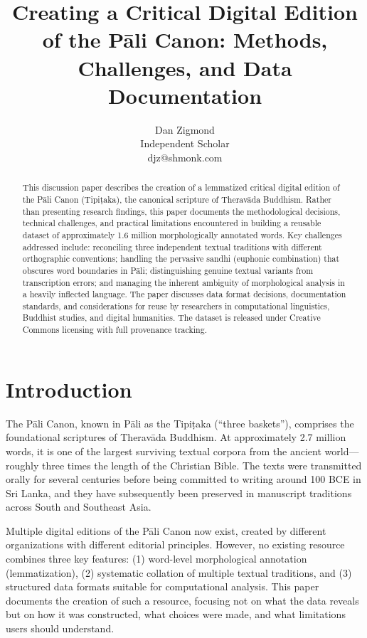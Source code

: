 \documentclass[12pt]{article}
\title{Creating a Critical Digital Edition of the Pāli Canon: Methods, Challenges, and Data Documentation}
\author{Dan Zigmond\\Independent Scholar\\djz@shmonk.com}
\date{}
\begin{document}
\maketitle

\begin{abstract}
This discussion paper describes the creation of a lemmatized critical digital edition of the Pāli Canon (Tipiṭaka), the canonical scripture of Theravāda Buddhism. Rather than presenting research findings, this paper documents the methodological decisions, technical challenges, and practical limitations encountered in building a reusable dataset of approximately 1.6 million morphologically annotated words. Key challenges addressed include: reconciling three independent textual traditions with different orthographic conventions; handling the pervasive sandhi (euphonic combination) that obscures word boundaries in Pāli; distinguishing genuine textual variants from transcription errors; and managing the inherent ambiguity of morphological analysis in a heavily inflected language. The paper discusses data format decisions, documentation standards, and considerations for reuse by researchers in computational linguistics, Buddhist studies, and digital humanities. The dataset is released under Creative Commons licensing with full provenance tracking.
\end{abstract}

\section{Introduction}

The Pāli Canon, known in Pāli as the Tipiṭaka (``three baskets''), comprises the foundational scriptures of Theravāda Buddhism. At approximately 2.7 million words, it is one of the largest surviving textual corpora from the ancient world---roughly three times the length of the Christian Bible. The texts were transmitted orally for several centuries before being committed to writing around 100 BCE in Sri Lanka, and they have subsequently been preserved in manuscript traditions across South and Southeast Asia.

Multiple digital editions of the Pāli Canon now exist, created by different organizations with different editorial principles. However, no existing resource combines three key features: (1) word-level morphological annotation (lemmatization), (2) systematic collation of multiple textual traditions, and (3) structured data formats suitable for computational analysis. This paper documents the creation of such a resource, focusing not on what the data reveals but on how it was constructed, what choices were made, and what limitations users should understand.
\end{document}
